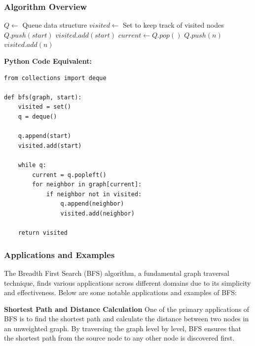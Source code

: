 \documentclass[12pt]{book} %
\begin{document}
\subsubsection{Algorithm Overview}


\FloatBarrier
\begin{algorithm}
\caption{Breadth-First Search (BFS)}
\begin{algorithmic}
\State $Q \gets$ Queue data structure
\State $visited \gets$ Set to keep track of visited nodes
\State $Q.push(start)$ 
\State $visited.add(start)$
    \State $current \gets Q.pop()$
            \State $Q.push(n)$
            \State $visited.add(n)$
        \EndIf
    \EndFor
\EndWhile
\end{algorithmic}
\end{algorithm}
\FloatBarrier
\textbf{Python Code Equivalent:}
\FloatBarrier

\begin{lstlisting}
from collections import deque

def bfs(graph, start):
    visited = set()
    q = deque()
    
    q.append(start)
    visited.add(start)
    
    while q:
        current = q.popleft()
        for neighbor in graph[current]:
            if neighbor not in visited:
                q.append(neighbor)
                visited.add(neighbor)
    
    return visited
\end{lstlisting}
\FloatBarrier

\subsubsection{Applications and Examples}

The Breadth First Search (BFS) algorithm, a fundamental graph traversal technique, finds various applications across different domains due to its simplicity and effectiveness. Below are some notable applications and examples of BFS:

\textbf{Shortest Path and Distance Calculation}
One of the primary applications of BFS is to find the shortest path and calculate the distance between two nodes in an unweighted graph. By traversing the graph level by level, BFS ensures that the shortest path from the source node to any other node is discovered first.
\end{document}
